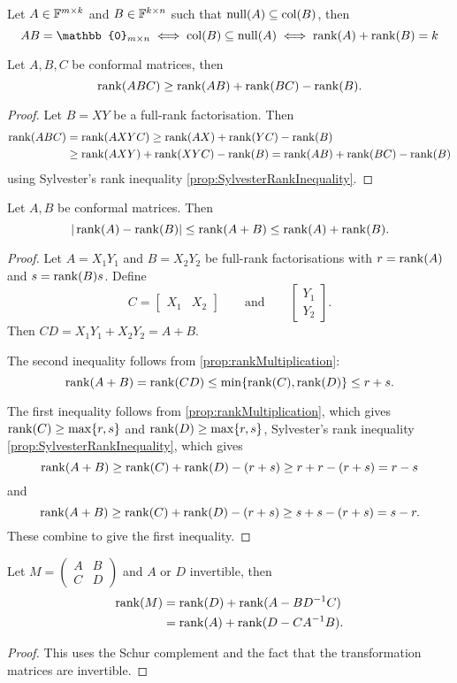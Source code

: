 \begin{corollary}
Let $A\in\mathbb{F}^{m\times k}$ and $B\in\mathbb{F}^{k\times n}$ such that $\operatorname{null}(A)\subseteq \operatorname{col}(B)$, then
\[ AB = \mathbb{0}_{m\times n} \iff \Col(B)\subseteq \Null(A) \iff \Rank(A) + \Rank(B) = k \]
\end{corollary}

\begin{proposition}
Let $A,B,C$ be conformal matrices, then
\[ \operatorname{rank}(ABC) \geq \operatorname{rank}(AB)+\operatorname{rank}(BC) - \operatorname{rank}(B). \]
\end{proposition}
\begin{proof}
Let $B = XY$ be a full-rank factorisation. Then
\begin{align*}
\operatorname{rank}(ABC) &= \operatorname{rank}(AXYC) \geq \operatorname{rank}(AX) + \operatorname{rank}(YC) - \operatorname{rank}(B) \\
&\geq \operatorname{rank}(AXY) + \operatorname{rank}(XYC) - \operatorname{rank}(B) = \operatorname{rank}(AB)+\operatorname{rank}(BC) - \operatorname{rank}(B)
\end{align*}
using Sylvester's rank inequality \ref{prop:SylvesterRankInequality}.
\end{proof}

\begin{proposition}
Let $A,B$ be conformal matrices. Then
\[ |\operatorname{rank}(A)-\operatorname{rank}(B)|\leq\operatorname{rank}(A+B)\leq \operatorname{rank}(A) + \operatorname{rank}(B). \]
\end{proposition}
\begin{proof}
Let $A=X_1Y_1$ and $B=X_2Y_2$ be full-rank factorisations with $r = \operatorname{rank}(A)$ and $s=\operatorname{rank}(B)s$. Define
\[ C = \begin{bmatrix}
X_1 & X_2
\end{bmatrix}\qquad\text{and}\qquad \begin{bmatrix}
Y_1 \\ Y_2
\end{bmatrix}. \]
Then $CD = X_1Y_1 + X_2Y_2 = A+B$.

The second inequality follows from \ref{prop:rankMultiplication}:
\[ \operatorname{rank}(A+B) = \operatorname{rank}(CD) \leq \min\{\operatorname{rank}(C),\operatorname{rank}(D)\} \leq r+s. \]

The first inequality follows from \ref{prop:rankMultiplication}, which gives $\operatorname{rank}(C)\geq\max\{r,s\}$ and $\operatorname{rank}(D)\geq\max\{r,s\}$, Sylvester's rank inequality \ref{prop:SylvesterRankInequality}, which gives
\[ \operatorname{rank}(A+B) \geq \operatorname{rank}(C) + \operatorname{rank}(D) - (r+s) \geq r+r-(r+s) = r-s \]
and
\[ \operatorname{rank}(A+B) \geq \operatorname{rank}(C) + \operatorname{rank}(D) - (r+s) \geq s+s-(r+s) = s-r. \]
These combine to give the first inequality.
\end{proof}

\begin{proposition}
Let $M=\begin{pmatrix}
A & B \\ C & D
\end{pmatrix}$ and $A$ or $D$ invertible, then
\begin{align*}
\operatorname{rank}(M) &= \operatorname{rank}(D) + \operatorname{rank}(A-BD^{-1}C) \\
&= \operatorname{rank}(A) + \operatorname{rank}(D-CA^{-1}B).
\end{align*}
\end{proposition}
\begin{proof}
This uses the Schur complement and the fact that the transformation matrices are invertible.
\end{proof}

